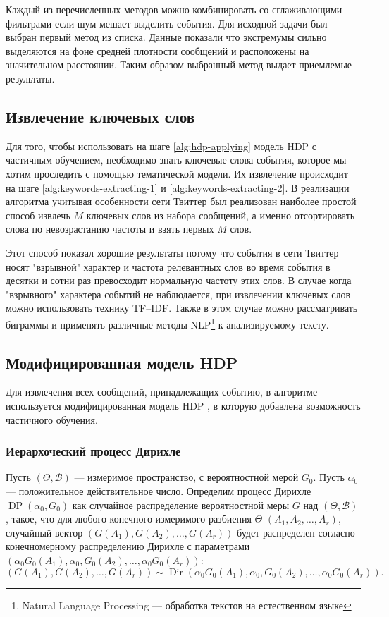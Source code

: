 \documentclass[12pt, a4paper]{article}
\DeclareMathOperator{\Dir}{Dir}
\DeclareMathOperator{\DP}{DP}
\begin{document}
  Каждый из перечисленных методов можно комбинировать со сглаживающими фильтрами если шум мешает выделить события.
  Для исходной задачи был выбран первый метод из списка. Данные показали что экстремумы сильно выделяются на фоне средней плотности сообщений и расположены на значительном расстоянии. Таким образом выбранный метод выдает приемлемые результаты.
  
  \subsection{Извлечение ключевых слов}
  Для того, чтобы использовать на шаге \ref{alg:hdp-applying} модель HDP с частичным обучением, необходимо знать ключевые слова события, которое мы хотим проследить с помощью тематической модели. Их извлечение происходит на шаге \ref{alg:keywords-extracting-1} и \ref{alg:keywords-extracting-2}. В реализации алгоритма учитывая особенности сети Твиттер был реализован наиболее простой способ извлечь $M$ ключевых слов из набора сообщений, а именно отсортировать слова по невозрастанию частоты и взять первых $M$ слов.
  
  Этот способ показал хорошие результаты потому что события в сети Твиттер носят "взрывной" характер и частота релевантных слов во время события в десятки и сотни раз превосходит нормальную частоту этих слов. В случае когда "взрывного" характера событий не наблюдается, при извлечении ключевых слов можно использовать технику TF--IDF. Также в этом случае можно рассматривать биграммы и применять различные методы NLP\footnote{Natural Language Processing --- обработка текстов на естественном языке} к анализируемому тексту.
  
  \subsection{Модифицированная модель HDP}
  Для извлечения всех сообщений, принадлежащих событию, в алгоритме используется модифицированная модель HDP , в которую добавлена возможность частичного обучения.
  
  \subsubsection{Иерархоческий процесс Дирихле}
  Пусть $(\Theta, \mathcal{B})$ --- измеримое пространство, с вероятностной мерой $G_0$. Пусть $\alpha_0$ --- положительное действительное число. Определим процесс Дирихле $\DP(\alpha_0, G_0)$ как случайное распределение вероятностной меры $G$ над $(\Theta, \mathcal{B})$, такое, что для любого конечного измеримого разбиения $\Theta$ $(A_1, A_2, \ldots, A_r)$, случайный вектор $(G(A_1), G(A_2), \ldots, G(A_r))$ будет распределен согласно конечномерному распределению Дирихле с параметрами $(\alpha_0 G_0(A_1), \alpha_0, G_0(A_2), \ldots, \alpha_0 G_0 (A_r))$:
  \begin{equation}
  (G(A_1), G(A_2), \ldots, G(A_r)) \sim \Dir(\alpha_0 G_0(A_1), \alpha_0, G_0(A_2), \ldots, \alpha_0 G_0 (A_r)).
  \end{equation}
  
\end{document}
